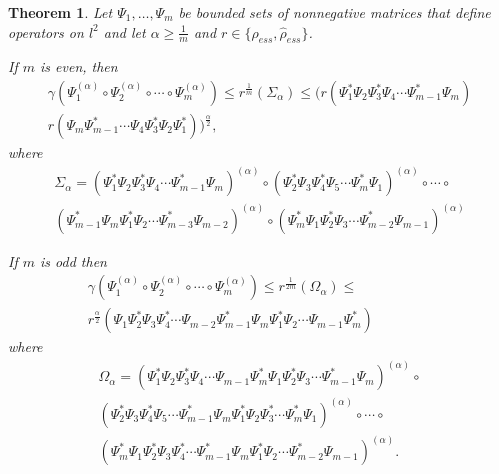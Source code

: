 \documentclass[12pt, reqno]{amsart}
\newtheorem{theorem}{Theorem}[section]
\theoremstyle{definition}
\theoremstyle{remark}
\numberwithin{equation}{section}
\begin{document}
\begin{theorem}
\label{thkate_ess}
Let $\Psi_1, \ldots , \Psi_m$ be bounded sets of nonnegative matrices that define operators on $l^2$ and let $\alpha \ge \frac{1}{m}$ and $r \in \{\rho _{ess},\hat{\rho}_{ess}\}$.

If $m$ is even, then
\begin{align}
\nonumber
\gamma (\Psi_1^{(\alpha)}\circ\Psi_2^{(\alpha)}\circ\cdots\circ\Psi_m^{(\alpha)})\le r^{\frac{1}{m}}(\Sigma_{\alpha})\le(r(\Psi_1^*\Psi_2\Psi_3^*\Psi_4\cdots\Psi_{m-1}^*\Psi_m)\\
r(\Psi_m\Psi_{m-1}^*\cdots\Psi_4\Psi_3^*\Psi_2\Psi_1^*))^{\frac{\alpha}{2}},
\label{alpha1_ess}
\end{align}
where
\begin{align}
\nonumber
\Sigma_{\alpha}=(\Psi_1^*\Psi_2\Psi_3^*\Psi_4\cdots\Psi_{m-1}^*\Psi_m)^{(\alpha)}\circ(\Psi_2^*\Psi_3\Psi_4^*\Psi_5\cdots\Psi_m^*\Psi_1)^{(\alpha)}\circ\cdots\circ\\
\nonumber
(\Psi_{m-1}^*\Psi_m\Psi_1^*\Psi_2\cdots\Psi_{m-3}^*\Psi_{m-2})^{(\alpha)}\circ(\Psi_m^*\Psi_1\Psi_2^*\Psi_3\cdots\Psi_{m-2}^*\Psi_{m-1})^{(\alpha)}
\end{align}

If $m$ is odd then
\begin{align}
\nonumber
\gamma (\Psi_1^{(\alpha)}\circ\Psi_2^{(\alpha)}\circ\cdots\circ\Psi_m^{(\alpha)}) \le r^{\frac{1}{2m}}(\Omega_{\alpha})\le\;\;\;\;\;\;\;\;\;\;\;\;\;\;\;\;\;\;\;\\
r^{\frac{\alpha}{2}}(\Psi_1\Psi_2^*\Psi_3\Psi_4^*\cdots\Psi_{m-2}\Psi_{m-1}^*\Psi_m\Psi_1^*\Psi_2\cdots\Psi_{m-1}\Psi_m^*)
\label{alpha2_ess}
\end{align}
where
\begin{align}
\nonumber
\Omega_{\alpha}=(\Psi_1^*\Psi_2\Psi_3^*\Psi_4\cdots\Psi_{m-1}\Psi_m^*\Psi_1\Psi_2^*\Psi_3\cdots\Psi_{m-1}^*\Psi_m)^{(\alpha)}\circ\\
\nonumber
(\Psi_2^*\Psi_3\Psi_4^*\Psi_5\cdots\Psi_{m-1}^*\Psi_m\Psi_1^*\Psi_2\Psi_3^*\cdots\Psi_m^*\Psi_1)^{(\alpha)}\circ\cdots\circ\\
\nonumber
(\Psi_m^*\Psi_1\Psi_2^*\Psi_3\Psi_4^*\cdots\Psi_{m-1}^*\Psi_m\Psi_1^*\Psi_2\cdots\Psi_{m-2}^*\Psi_{m-1})^{(\alpha)}.
\end{align}
\end{theorem}

\medskip
\end{document}
